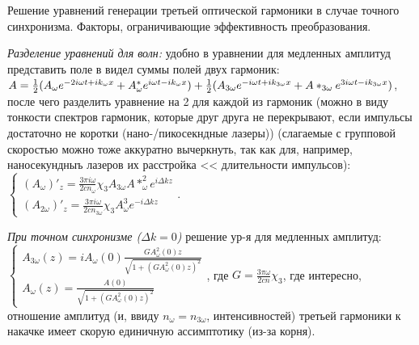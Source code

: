 
\begin{leftrules}
Решение уравнений генерации третьей оптической гармоники в случае точного синхронизма. Факторы, ограничивающие эффективность преобразования.
\end{leftrules}




\textit{Разделение уравнений для волн:} удобно в уравнении для медленных амплитуд представить поле в видел суммы полей двух гармоник: $A = \frac{1}{2} (A_{\omega}e^{-2i\omega t +i k_{\omega}x} + A^*_{\omega}e^{i\omega t -i k_{\omega}x}) + \\ \frac{1}{2} (A_{3\omega}e^{-i\omega t +i k_{3\omega}x} + A*_{3\omega}e^{3i\omega t -i k_{3\omega}x})$, после чего разделить уравнение на 2 для каждой из гармоник (можно в виду тонкости спектров гармоник, которые друг друга не перекрывают, если импульсы достаточно не коротки (нано-/пикосекндные лазеры)) (слагаемые с групповой скоростью можно тоже аккуратно вычеркнуть, так как для, например, наносекундныъ лазеров их расстройка << длительности импульсов): $
    \begin{cases}
        (A_{\omega})'_{z}=\frac{3\pi i \omega}{2cn_{\omega}} \chi_{3} A_{3\omega}A*_{\omega}^{2} e^{i \Delta k z} \\
        (A_{2\omega})'_{z}=\frac{3\pi i \omega}{2cn_{3\omega}} \chi_{3} A_{\omega}^{3} e^{- i \Delta k z} 
    \end{cases}$.


\textit{При точном синхронизме ($\Delta k = 0$)} решение ур-я для медленных амплитуд: \\$
    \begin{cases}
        A_{3\omega}(z)=iA_{\omega}(0)\frac{GA_{\omega}^{2}(0)z}{\sqrt{1+(GA_{\omega}^{2}(0)z)^{2}}} \\
        A_{\omega}(z)=\frac{A(0)}{\sqrt{1+(GA_{\omega}^{2}(0)z)^{2}}}
    \end{cases}$, где $G=\frac{3\pi \omega}{2cn}\chi_{3}$, где интересно, отношение амплитуд (и, ввиду $n_{\omega}=n_{3\omega}$, интенсивностей) третьей гармоники к накачке имеет скорую единичную ассимптотику (из-за корня).


